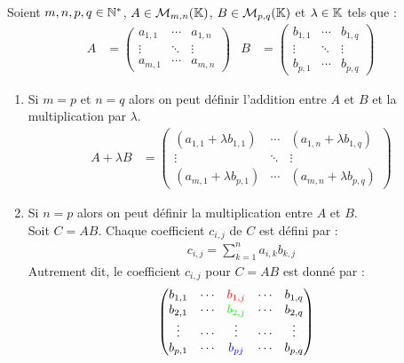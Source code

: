 \begin{definition}
	Soient $m, n, p, q \in \mathbb{N}^*$, $A \in \mathcal{M}_{m, n}(\mathbb{K})$, $B \in \mathcal{M}_{p, q}(\mathbb{K})$ et $\lambda  \in \mathbb{K}$ tels que :
	\begin{align*}
		A &=
		\begin{pmatrix}
			a_{1,1} & \cdots & a_{1,n} \\
			\vdots & \ddots & \vdots \\
			a_{m,1} & \cdots & a_{m,n}
		\end{pmatrix}
		&
		B &= 
		\begin{pmatrix}
			b_{1,1} & \cdots & b_{1,q} \\
			\vdots & \ddots & \vdots \\
			b_{p,1} & \cdots & b_{p,q}
		\end{pmatrix}
	\end{align*}
	\begin{enumerate}
		\item Si $m = p$ et $n = q$ alors on peut définir l'addition entre $A$ et $ B$ et la multiplication par $\lambda$.
		\begin{align*}
			A + \lambda B &= 
			\begin{pmatrix}
				(a_{1,1} + \lambda b_{1,1}) & \cdots & (a_{1,n} + \lambda b_{1,q}) \\
				\vdots & \ddots & \vdots \\
				(a_{m,1} + \lambda b_{p,1}) & \cdots & (a_{m,n} + \lambda b_{p,q})
			\end{pmatrix}
		\end{align*}
		\item Si $n = p$ alors on peut définir la multiplication entre $A$ et $B$.\\
		Soit $C = AB$. Chaque coefficient $c_{i,j}$ de $C$ est défini par :
		\begin{align*}
			c_{i,j} = \sum_{k=1}^{n} a_{i,k} b_{k,j}
		\end{align*}
        Autrement dit, le coefficient $c_{i,j}$ pour $C = AB$ est donné par :
        \begin{align*}
            &\begin{pmatrix}
                b_{1,1} & \cdots & \color{red}b_{1,j} & \cdots & b_{1,q} \\
                b_{2,1} & \cdots & \color{green}b_{2,j} & \cdots & b_{2,q} \\
                \vdots & \cdots & \vdots & \cdots & \vdots \\
                b_{p,1} & \cdots & \color{blue}b_{pj} & \cdots & b_{p,q}

\end{pmatrix}
\end{align*}
\end{enumerate}
\end{definition}
